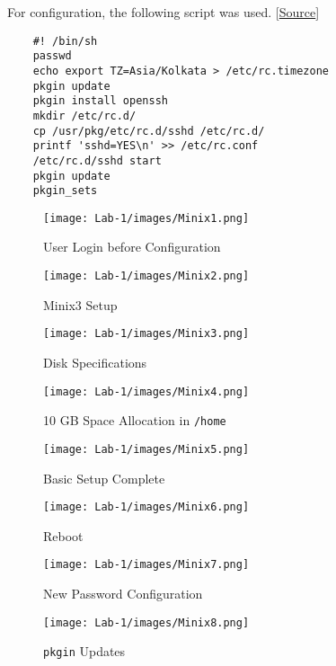 \documentclass[12pt]{article}
\begin{document}
For configuration, the following script was used. [\href{https://github.com/tejaswivykuntam/OS_LAB/blob/master/setup.sh}{Source}]

\begin{verbatim}
    #! /bin/sh
    passwd
    echo export TZ=Asia/Kolkata > /etc/rc.timezone
    pkgin update
    pkgin install openssh
    mkdir /etc/rc.d/
    cp /usr/pkg/etc/rc.d/sshd /etc/rc.d/
    printf 'sshd=YES\n' >> /etc/rc.conf
    /etc/rc.d/sshd start
    pkgin update
    pkgin_sets
\end{verbatim}


\begin{figure}
    \centering
    \texttt{[image: Lab-1/images/Minix1.png]}
    \caption{User Login before Configuration}
\end{figure}

\begin{figure}
    \centering
    \texttt{[image: Lab-1/images/Minix2.png]}
    \caption{Minix3 Setup}
\end{figure}

\begin{figure}
    \centering
    \texttt{[image: Lab-1/images/Minix3.png]}
    \caption{Disk Specifications}
\end{figure}

\begin{figure}
    \centering
    \texttt{[image: Lab-1/images/Minix4.png]}
    \caption{10 GB Space Allocation in \texttt{/home}}
\end{figure}

\begin{figure}
    \centering
    \texttt{[image: Lab-1/images/Minix5.png]}
    \caption{Basic Setup Complete}
\end{figure}

\begin{figure}
    \centering
    \texttt{[image: Lab-1/images/Minix6.png]}
    \caption{Reboot}
\end{figure}

\begin{figure}
    \centering
    \texttt{[image: Lab-1/images/Minix7.png]}
    \caption{New Password Configuration} %
\end{figure}

\begin{figure}
    \centering
    \texttt{[image: Lab-1/images/Minix8.png]}
    \caption{\texttt{pkgin} Updates}
\end{figure}
\end{document}
